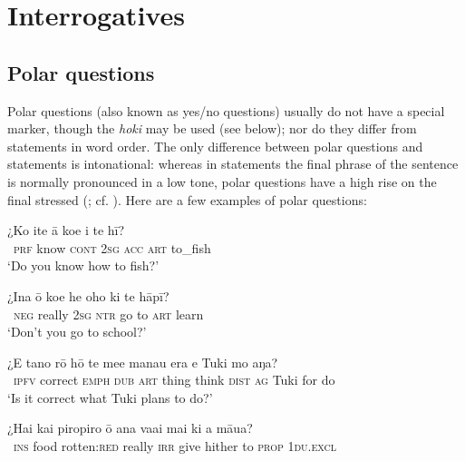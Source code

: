 \section{Interrogatives}\label{sec:10.3}
\subsection{Polar questions}\label{sec:10.3.1}
Polar questions (also known as yes/no questions) usually do not have a special marker, though the  \textit{hoki} may be used (see below); nor do they differ from statements in word order. The only difference between polar questions and statements is intonational: whereas in statements the final phrase of the sentence is normally pronounced in a low tone, polar questions have a high rise on the final stressed  (; cf. \citealt[27]{DuFeu1995}). Here are a few examples of polar questions:

\ea\label{ex:10.17}
\gll ¿Ko {\ꞌ}ite {\ꞌ}ā koe i te hī? \\
~\textsc{prf} know \textsc{cont} \textsc{2sg} \textsc{acc} \textsc{art} to\_fish \\

\glt 
‘Do you know how to fish?’ \textstyleExampleref{[R245.101]} 
\z

\ea\label{ex:10.18}
\gll ¿{\ꞌ}Ina {\ꞌ}ō koe he oho ki te hāpī? \\
~\textsc{neg} really \textsc{2sg} \textsc{ntr} go to \textsc{art} learn \\

\glt 
‘Don’t you go to school?’ \textstyleExampleref{[R245.086]} 
\z

\ea\label{ex:10.19}
\gll ¿E tano rō hō te me{\ꞌ}e mana{\ꞌ}u era e Tuki mo aŋa? \\
~\textsc{ipfv} correct \textsc{emph} \textsc{dub} \textsc{art} thing think \textsc{dist} \textsc{ag} Tuki for do \\

\glt 
‘Is it correct what Tuki plans to do?’ \textstyleExampleref{[R535.211]} 
\z

\ea\label{ex:10.20}
\gll ¿Hai kai piropiro {\ꞌ}ō ana va{\ꞌ}ai mai ki a māua? \\
~\textsc{ins} food rotten:\textsc{red} really \textsc{irr} give hither to \textsc{prop} \textsc{1du.excl} \\


